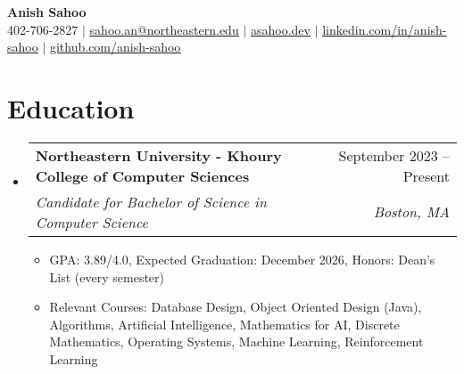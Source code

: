 \documentclass[letterpaper,11pt]{article}
\makeatletter
\newcommand{\resumeItem}[1]{
  \item\small{
    {#1 \vspace{-2pt}}
  }
}
\newcommand{\resumeSubheading}[4]{
  \vspace{-2pt}\item
    \begin{tabular*}{0.97\textwidth}[t]{l@{\extracolsep{\fill}}r}
      \textbf{#1} & #2 \\
      \textit{\small#3} & \textit{\small #4} \\
    \end{tabular*}\vspace{-7pt}
}
\newcommand{\resumeSubHeadingListStart}{\begin{itemize}[leftmargin=0.15in, label={}]}
\newcommand{\resumeSubHeadingListEnd}{\end{itemize}}
\newcommand{\resumeItemListStart}{\begin{itemize}}
\newcommand{\resumeItemListEnd}{\end{itemize}\vspace{-5pt}}
\makeatother
\begin{document}

\begin{center}
    \textbf{\Huge Anish Sahoo} \\ \vspace{1pt}
    \small 402-706-2827 
    $|$ 
    \href{mailto:sahoo.an@northeastern.edu}{\underline{sahoo.an@northeastern.edu}} $|$ 
    \href{https://asahoo.dev}{\underline{asahoo.dev}}
    $|$
    \href{https://linkedin.com/in/anish-sahoo}{\underline{linkedin.com/in/anish-sahoo}} $|$
    \href{https://github.com/anish-sahoo}{\underline{github.com/anish-sahoo}}
\end{center}


\section{Education}
  \resumeSubHeadingListStart
    \resumeSubheading
      {Northeastern University - Khoury College of Computer Sciences}{September 2023 -- Present}
      {Candidate for Bachelor of Science in Computer Science}{Boston, MA}
    \resumeItemListStart
        \resumeItem{GPA: 3.89/4.0, Expected Graduation: December 2026, Honors: Dean's List (every semester)}
        \resumeItem{Relevant Courses: Database Design, Object Oriented Design (Java), Algorithms, Artificial Intelligence, Mathematics for AI, Discrete Mathematics, Operating Systems, Machine Learning, Reinforcement Learning}
    \resumeItemListEnd
  \resumeSubHeadingListEnd



\end{document}

